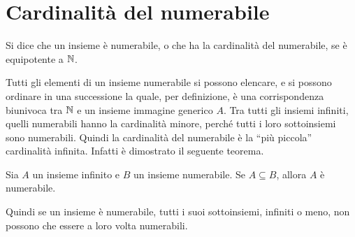 \section{Cardinalità del numerabile}
\begin{definizione}
Si dice che un insieme è numerabile, o che ha la cardinalità del numerabile, se è equipotente a $\mathbb{N}$.
\end{definizione}
Tutti gli elementi di un insieme numerabile si possono elencare, e si possono ordinare in una successione la quale, per definizione, è una corrispondenza biunivoca tra $\mathbb{N}$ e un insieme immagine generico $A$.
Tra tutti gli insiemi infiniti, quelli numerabili hanno la cardinalità minore, perché tutti i loro sottoinsiemi sono numerabili. Quindi la cardinalità del numerabile è la ``più piccola'' cardinalità infinita. Infatti è dimostrato il seguente teorema.
\begin{teorema}
Sia $A$ un insieme infinito e $B$ un insieme numerabile. Se $A\subseteq B$, allora $A$ è numerabile.
\end{teorema}
Quindi se un insieme è numerabile, tutti i suoi sottoinsiemi, infiniti o meno, non possono che essere a loro volta numerabili.%

